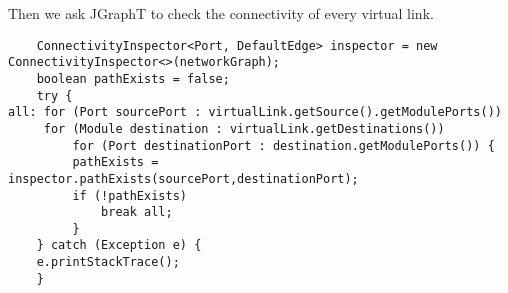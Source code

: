 Then we ask JGraphT to check the connectivity of every virtual link.
\begin{verbatim}
    ConnectivityInspector<Port, DefaultEdge> inspector = new ConnectivityInspector<>(networkGraph);
    boolean pathExists = false;
    try {
all: for (Port sourcePort : virtualLink.getSource().getModulePorts()) 
	 for (Module destination : virtualLink.getDestinations()) 
	     for (Port destinationPort : destination.getModulePorts()) {
		 pathExists = inspector.pathExists(sourcePort,destinationPort);
		 if (!pathExists)
		     break all;
	     }
    } catch (Exception e) {
	e.printStackTrace();
    }
\end{verbatim}
